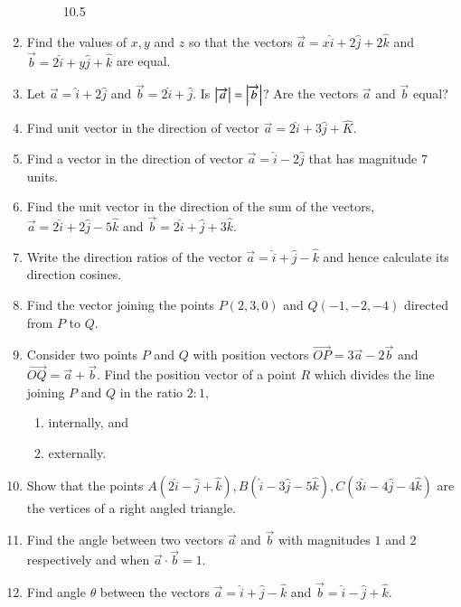 \documentclass{article}
\theoremstyle{remark}
\begin{document}
\begin{enumerate}
\begin{figure}[ht]
\caption{10.5}                                          
\label{fig:10.5}                                       
\end{figure}
\item Find the values of $x,y$ and $z$ so that the vectors $\overrightarrow{a} = x\hat{i} +2\hat{j} +2\hat{k}$ and $\overrightarrow{b} = 2\hat{i} +y\hat{j} +\hat{k}$ are equal.
\item Let $\overrightarrow{a}=\hat{i} +2\hat{j}$ and $\overrightarrow{b} = 2\hat{i} +\hat{j}$. Is $\left\vert\overrightarrow{a}\right\vert = \left\vert\overrightarrow{b}\right\vert$? Are the vectors $\overrightarrow{a}$ and $\overrightarrow{b}$ equal?
\item Find unit vector in the direction of vector $\overrightarrow{a} = 2\hat{i} +3\hat{j} +\hat{K}$.
\item Find a vector in the direction of vector $\overrightarrow{a}=\hat{i} -2\hat{j}$ that has magnitude $7$ units.
\item Find the unit vector in the direction of the sum of the vectors, $\overrightarrow{a} = 2\hat{i} +2\hat{j} -5\hat{k}$ and $\overrightarrow{b} = 2\hat{i} +\hat{j} +3\hat{k}$.
\item Write the direction ratios of the vector $\overrightarrow{a} = \hat{i} +\hat{j} -\hat{k}$ and hence calculate its direction cosines.
\item Find the vector joining the points $P(2,3,0)$ and $Q(-1,-2,-4)$ directed from $P$ to $Q$.
\item Consider two points $P$ and $Q$ with position vectors $\overrightarrow{OP} = 3\overrightarrow{a}-2\overrightarrow{b}$ and $\overrightarrow{OQ}=\overrightarrow{a}+\overrightarrow{b}$. Find the position vector of a point $R$ which divides the line joining $P$ and $Q$ in the ratio $2:1$, 
\begin{enumerate}[label=(\roman*)]
\item internally, and 
\item externally.
\end{enumerate}
\item Show that the points $A(2\hat{i} -\hat{j} +\hat{k}), B(\hat{i} -3\hat{j}-5\hat{k}),C(3\hat{i} -4\hat{j} -4\hat{k})$ are the vertices of a right angled triangle.
\item Find the angle between two vectors $\overrightarrow{a}$ and $\overrightarrow{b}$ with magnitudes $1$ and $2$ respectively and when $\overrightarrow{a}\cdot \overrightarrow{b} = 1$.
\item Find angle $\theta$ between the vectors $\overrightarrow{a} = \hat{i} +\hat{j} -\hat{k}$ and $\overrightarrow{b} = \hat{i} -\hat{j}+\hat{k}$.

\end{enumerate}
\end{document}

